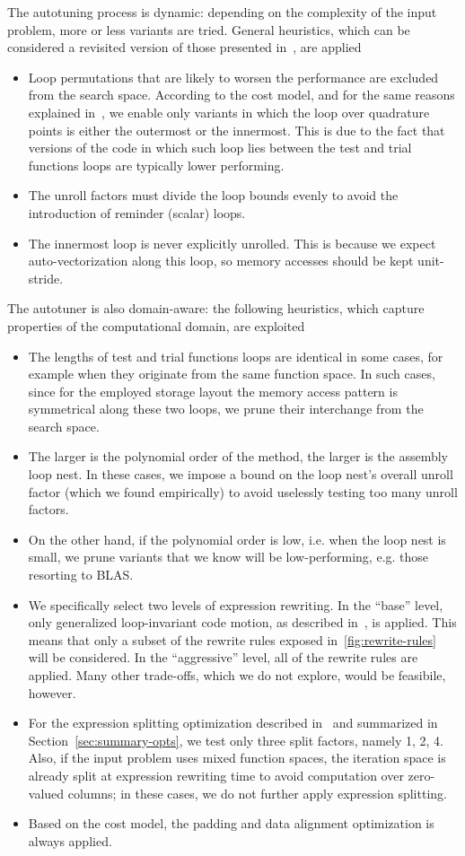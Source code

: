 The autotuning process is dynamic: depending on the complexity of the input problem, more or less variants are tried. General heuristics, which can be considered a revisited version of those presented in~\cite{nek5000}, are applied
\begin{itemize}
\item Loop permutations that are likely to worsen the performance are excluded from the search space. According to the cost model, and for the same reasons explained in~\cite{Luporini}, we enable only variants in which the loop over quadrature points is either the outermost or the innermost. This is due to the fact that versions of the code in which such loop lies between the test and trial functions loops are typically lower performing.
\item The unroll factors must divide the loop bounds evenly to avoid the introduction of reminder (scalar) loops.
\item The innermost loop is never explicitly unrolled. This is because we expect auto-vectorization along this loop, so memory accesses should be kept unit-stride. 
\end{itemize}
The autotuner is also domain-aware: the following heuristics, which capture properties of the computational domain, are exploited
\begin{itemize}
\item The lengths of test and trial functions loops are identical in some cases, for example when they originate from the same function space. In such cases, since for the employed storage layout the memory access pattern is symmetrical along these two loops, we prune their interchange from the search space. 
\item The larger is the polynomial order of the method, the larger is the assembly loop nest. In these cases, we impose a bound on the loop nest's overall unroll factor (which we found empirically) to avoid uselessly testing too many unroll factors. 
\item On the other hand, if the polynomial order is low, i.e. when the loop nest is small, we prune variants that we know will be low-performing, e.g. those resorting to BLAS.
\item We specifically select two levels of expression rewriting. In the ``base'' level, only generalized loop-invariant code motion, as described in~\cite{Luporini}, is applied. This means that only a subset of the rewrite rules exposed in~\ref{fig:rewrite-rules} will be considered. In the ``aggressive'' level, all of the rewrite rules are applied. Many other trade-offs, which we do not explore, would be feasibile, however. 
\item For the expression splitting optimization described in~\cite{Luporini} and summarized in Section~\ref{sec:summary-opts}, we test only three split factors, namely 1, 2, 4. Also, if the input problem uses mixed function spaces, the iteration space is already split at expression rewriting time to avoid computation over zero-valued columns; in these cases, we do not further apply expression splitting.
\item Based on the cost model, the padding and data alignment optimization is always applied. 
\end{itemize}

